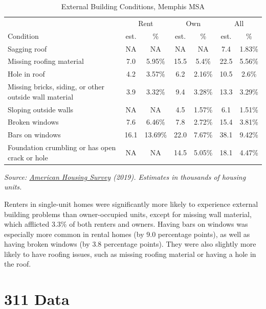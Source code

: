 \documentclass[
  openany]{book}
\begin{document}
\begin{table}

\caption{\label{tab:unnamed-chunk-9}External Building Conditions, Memphis MSA}
\centering
\begin{tabular}[t]{l|c|c|c|c|c|c}
\hline
\multicolumn{1}{c|}{ } & \multicolumn{2}{c|}{Rent} & \multicolumn{2}{c|}{Own} & \multicolumn{2}{c}{All} \\
\cline{2-3} \cline{4-5} \cline{6-7}
Condition & est. & \% & est. & \% & est. & \%\\
\hline
Sagging roof & NA & NA & NA & NA & 7.4 & 1.83\%\\
\hline
Missing roofing material & 7.0 & 5.95\% & 15.5 & 5.4\% & 22.5 & 5.56\%\\
\hline
Hole in roof & 4.2 & 3.57\% & 6.2 & 2.16\% & 10.5 & 2.6\%\\
\hline
Missing bricks, siding, or other outside wall material & 3.9 & 3.32\% & 9.4 & 3.28\% & 13.3 & 3.29\%\\
\hline
Sloping outside walls & NA & NA & 4.5 & 1.57\% & 6.1 & 1.51\%\\
\hline
Broken windows & 7.6 & 6.46\% & 7.8 & 2.72\% & 15.4 & 3.81\%\\
\hline
Bars on windows & 16.1 & 13.69\% & 22.0 & 7.67\% & 38.1 & 9.42\%\\
\hline
Foundation crumbling or has open crack or hole & NA & NA & 14.5 & 5.05\% & 18.1 & 4.47\%\\
\hline
\end{tabular}
\end{table}

\emph{Source: \href{https://www.census.gov/newsroom/press-releases/2020/2019-american-housing-survey.html}{American Housing Survey} (2019). Estimates in thousands of housing units.}

Renters in single-unit homes were significantly more likely to experience external building problems than owner-occupied units, except for missing wall material, which afflicted 3.3\% of both renters and owners. Having bars on windows was especially more common in rental homes (by 9.0 percentage points), as well as having broken windows (by 3.8 percentage points). They were also slightly more likely to have roofing issues, such as missing roofing material or having a hole in the roof.

\hypertarget{data}{%
\chapter{311 Data}\label{data}}
\end{document}
